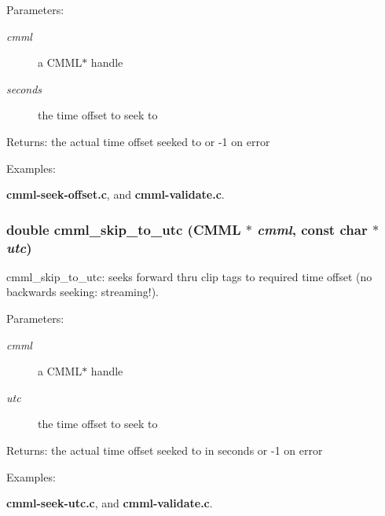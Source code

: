 \begin{Desc}
\item[Parameters:]
\begin{description}
\item[{\em cmml}]a CMML$\ast$ handle \item[{\em seconds}]the time offset to seek to\end{description}
\end{Desc}
\begin{Desc}
\item[Returns:]the actual time offset seeked to or -1 on error \end{Desc}
\begin{Desc}
\item[Examples: ]\par
{\bf cmml-seek-offset.c}, and {\bf cmml-validate.c}.\end{Desc}
\subsubsection{\setlength{\rightskip}{0pt plus 5cm}double cmml\_\-skip\_\-to\_\-utc ({\bf CMML} $\ast$ {\em cmml}, const char $\ast$ {\em utc})}\label{cmml_8h_a53}


cmml\_\-skip\_\-to\_\-utc: seeks forward thru clip tags to required time offset (no backwards seeking: streaming!).

\begin{Desc}
\item[Parameters:]
\begin{description}
\item[{\em cmml}]a CMML$\ast$ handle \item[{\em utc}]the time offset to seek to\end{description}
\end{Desc}
\begin{Desc}
\item[Returns:]the actual time offset seeked to in seconds or -1 on error \end{Desc}
\begin{Desc}
\item[Examples: ]\par
{\bf cmml-seek-utc.c}, and {\bf cmml-validate.c}.\end{Desc}
